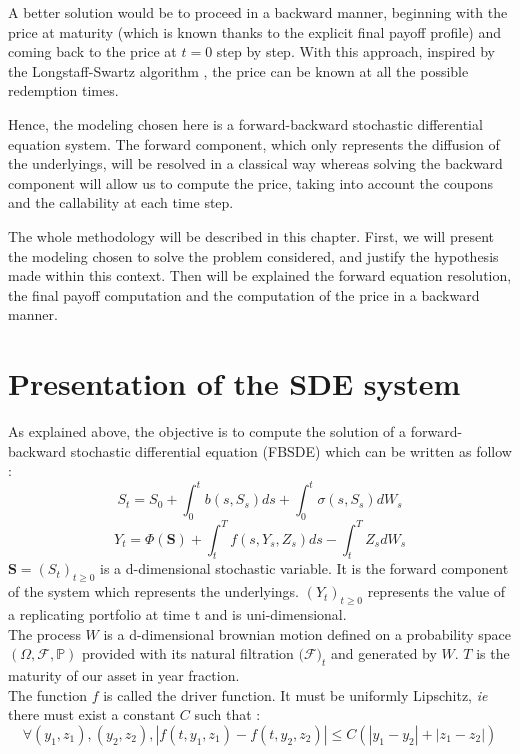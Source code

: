 \documentclass[a4paper,11pt,english]{book}
\begin{document}
A better solution would be to proceed in a backward manner, beginning with the price at maturity (which is known thanks to the explicit final payoff profile) and coming back to the price at $t=0$ step by step. With this approach, inspired by the Longstaff-Swartz algorithm \cite{schwartz2001valuing}, the price can be known at all the possible redemption times.

Hence, the modeling chosen here is a forward-backward stochastic differential equation system. The forward component, which only represents the diffusion of the underlyings, will be resolved in a classical way whereas solving the backward component will allow us to compute the price, taking into account the coupons and the callability at each time step.

The whole methodology will be described in this chapter. First, we will present the modeling chosen to solve the problem considered, and justify the hypothesis made within this context. Then will be explained the forward equation resolution, the final payoff computation and the computation of the price in a backward manner.


\section{Presentation of the SDE system}
\label{sec:SDE-presentation}
As explained above, the objective is to compute the solution of  a forward-backward stochastic differential equation (FBSDE) which can be written as follow :
$$S_{t} = S_{0}+\int_{0}^{t}b(s,S_{s})ds +\int_{0}^{t} \sigma(s,S_{s})dW_{s}$$
$$Y_{t} = \Phi(\textbf{S}) + \int_{t}^{T}f(s,Y_{s},Z_{s})ds -\int_{t}^{T}Z_{s}dW_{s}$$
$\textbf{S}=(S_{t})_{t\geq0}$ is a d-dimensional stochastic variable. It is the forward component of the system which represents the underlyings. $(Y_{t})_{t\geq0}$ represents the value of a replicating portfolio at time t and is uni-dimensional.\\
The process $W$ is a d-dimensional brownian motion defined on a probability space $(\Omega,\mathcal{F},\mathbb{P})$ provided with its natural filtration $(\mathcal{F)}_{t}$ and generated by $W$. 
$T$ is the maturity of our asset in year fraction.\\

The function $f$ is called the driver function. It must be uniformly Lipschitz, \textit{ie} there must exist a constant $C$ such that :
$$\forall (y_{1},z_{1}),(y_{2},z_{2}), |f(t,y_{1},z_{1})-f(t,y_{2},z_{2})|\leq C(|y_{1}-y_{2}|+|z_{1}-z_{2}|)$$
\end{document}
